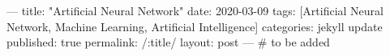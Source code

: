 ---
title: "Artificial Neural Network"
date: 2020-03-09
tags: [Artificial Neural Network, Machine Learning, Artificial Intelligence]
categories: jekyll update
published: true
permalink: /:title/
layout: post
---
# to be added
